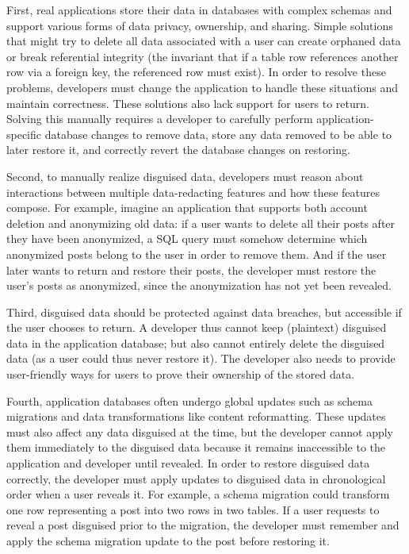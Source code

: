 %
First, real applications store their data in databases with complex schemas and
support various forms of data privacy, ownership, and sharing.
%
Simple solutions that might try to delete all data associated with a user can
create orphaned data or break referential integrity (the invariant that if a
table row references another row via a foreign key, the referenced row must
exist). 
%
In order to resolve these problems, developers must change the application to
handle these situations and maintain correctness. These solutions also lack
support for users to return.
%
Solving this manually requires a developer to carefully perform
application-specific database changes to remove data, store any data removed to
be able to later restore it, and correctly revert the database changes on
restoring.
%

%
Second, to manually realize disguised data, developers must reason about
interactions between multiple data-redacting features and how these features
compose.
%
For example, imagine an application that supports both account deletion and
anonymizing old data: if a user wants to delete all their posts after they have
been anonymized, a SQL query must somehow determine which anonymized posts
belong to the user in order to remove them.
%
And if the user later wants to return and restore their posts, the developer
must restore the user's posts as anonymized, since the anonymization has not yet
been revealed.
%

%
Third, disguised data should be protected against data breaches, but accessible
if the user chooses to return. A developer thus cannot keep (plaintext)
disguised data in the application database; but also cannot entirely delete the
disguised data (as a user could thus never restore it). The developer also needs
to provide user-friendly ways for users to prove their ownership of the stored
data.
%

%
Fourth, application databases often undergo global updates such as schema
migrations and data transformations like content reformatting. These updates
must also affect any data disguised at the time, but the developer cannot apply
them immediately to the disguised data because it remains inaccessible to the
application and developer until revealed. In order to restore disguised data
correctly, the developer must apply updates to disguised
data in chronological order when a user reveals it.
%
For example, a schema migration could transform one row representing a post into
two rows in two tables. If a user requests to reveal a post disguised prior
to the migration, the developer must remember and apply the schema migration
update to the post before restoring it.
%


